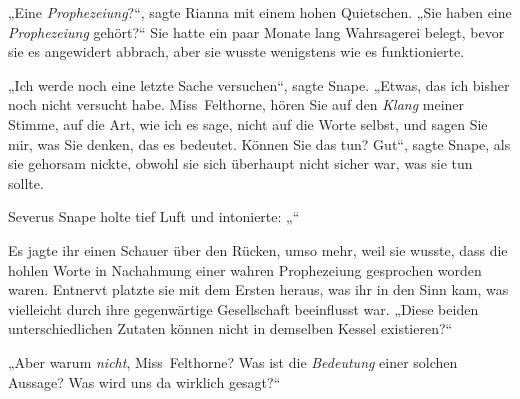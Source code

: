 „Eine \emph{Prophezeiung}?“, sagte Rianna mit einem hohen Quietschen. „Sie haben eine \emph{Prophezeiung} gehört?“ Sie hatte ein paar Monate lang Wahrsagerei belegt, bevor sie es angewidert abbrach, aber sie wusste wenigstens wie es funktionierte.

„Ich werde noch eine letzte Sache versuchen“, sagte Snape. „Etwas, das ich bisher noch nicht versucht habe. Miss~Felthorne, hören Sie auf den \emph{Klang} meiner Stimme, auf die Art, wie ich es sage, nicht auf die Worte selbst, und sagen Sie mir, was Sie denken, das es bedeutet. Können Sie das tun? Gut“, sagte Snape, als sie gehorsam nickte, obwohl sie sich überhaupt nicht sicher war, was sie tun sollte.

Severus Snape holte tief Luft und intonierte: „“

Es jagte ihr einen Schauer über den Rücken, umso mehr, weil sie wusste, dass die hohlen Worte in Nachahmung einer wahren Prophezeiung gesprochen worden waren. Entnervt platzte sie mit dem Ersten heraus, was ihr in den Sinn kam, was vielleicht durch ihre gegenwärtige Gesellschaft beeinflusst war. „Diese beiden unterschiedlichen Zutaten können nicht in demselben Kessel existieren?“

„Aber warum \emph{nicht}, Miss~Felthorne? Was ist die \emph{Bedeutung} einer solchen Aussage? Was wird uns da wirklich gesagt?“

